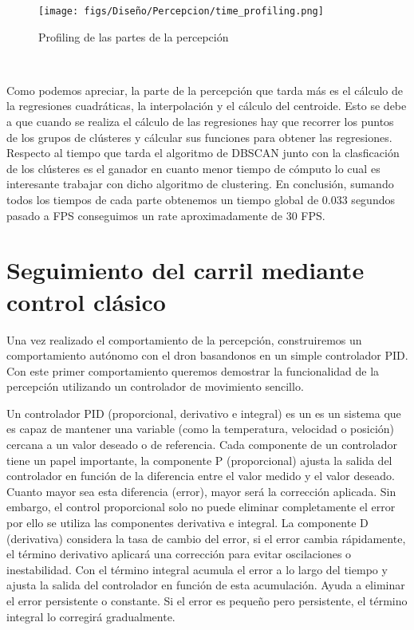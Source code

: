   \begin{figure} [H]
    \begin{center}
      \texttt{[image: figs/Diseño/Percepcion/time\_profiling.png]}
    \end{center}
    \caption{Profiling de las partes de la percepción}
    \label{fig:centro de masas}
  \end{figure}\

  Como podemos apreciar, la parte de la percepción que tarda más es el cálculo de la regresiones cuadráticas, la interpolación y el cálculo del centroide. Esto se debe a que
  cuando se realiza el cálculo de las regresiones hay que recorrer los puntos de los grupos de clústeres y cálcular sus funciones para obtener las regresiones. Respecto al 
  tiempo que tarda el algoritmo de DBSCAN junto con la clasficación de los clústeres es el ganador en cuanto menor tiempo de cómputo lo cual es interesante trabajar 
  con dicho algoritmo de clustering. En conclusión, sumando todos los tiempos de cada parte obtenemos un tiempo global de 0.033 segundos pasado a FPS conseguimos un rate aproximadamente
  de 30 FPS. 

  \section{Seguimiento del carril mediante control clásico}
  \label{sec:Control}

  Una vez realizado el comportamiento de la percepción, construiremos un comportamiento autónomo con el dron basandonos en un simple controlador PID. 
 Con este primer comportamiento queremos demostrar la funcionalidad de la percepción utilizando un controlador de movimiento sencillo. \newline

 Un controlador PID (proporcional, derivativo e integral) es un 
  es un sistema que es capaz de mantener una variable (como la temperatura, velocidad o posición) cercana a un valor deseado o de referencia. Cada componente de un controlador tiene un papel 
  importante,
  la componente P (proporcional) ajusta la salida del controlador en función de la diferencia entre el valor medido y el valor deseado. 
  Cuanto mayor sea esta diferencia (error), mayor será la corrección aplicada. Sin embargo, el control proporcional solo no puede eliminar completamente el error por ello se utiliza
  las componentes derivativa e integral. La componente D (derivativa) considera la tasa de cambio del error,
  si el error cambia rápidamente, el término derivativo aplicará una corrección para evitar oscilaciones o inestabilidad.
  Con el término integral acumula el error a lo largo del tiempo y ajusta la salida del controlador en función de esta acumulación. 
  Ayuda a eliminar el error persistente o constante. Si el error es pequeño pero persistente, el término integral lo corregirá gradualmente.
  \newline

